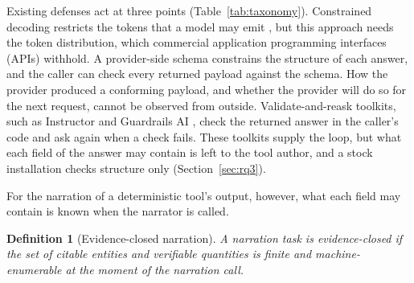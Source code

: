 \documentclass[10pt,twocolumn]{article}
\newtheorem{definitionx}{Definition}
\begin{document}
Existing defenses act at three points (Table~\ref{tab:taxonomy}). Constrained
decoding restricts the tokens that a model may
emit \citep{outlines,lmql,gcd,guidance,scholak2021picard}, but this approach
needs the token distribution, which commercial application programming
interfaces (APIs) withhold. A provider-side
schema \citep{structured} constrains the structure of each answer, and the
caller can check every returned payload against the schema. How the provider
produced a conforming payload, and whether the provider will do so for the
next request, cannot be observed from outside. Validate-and-reask toolkits,
such as Instructor \citep{liu2023instructor} and Guardrails
AI \citep{guardrailsai}, check the returned answer in the caller's code and ask
again when a check fails. These toolkits supply the loop, but what each field
of the answer may contain is left to the tool author, and a stock installation
checks structure only (Section~\ref{sec:rq3}).

For the narration of a deterministic tool's output, however, what each field
may contain is known when the narrator is called.

\begin{definitionx}[Evidence-closed narration]\label{def:closed}
A narration task is \emph{evidence-closed} if the set of citable entities and
verifiable quantities is finite and machine-enumerable at the moment of the
narration call.
\end{definitionx}
\end{document}
